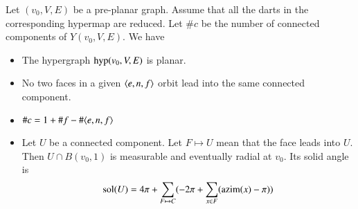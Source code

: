 \begin{lemma}  Let $(v_0,V,E)$ be a pre-planar graph.  Assume
that all the darts in the corresponding hypermap are reduced.   
Let $\#c$ be the number
of connected components of $Y(v_0,V,E)$.  We have
    \begin{itemize}
    \item The hypergraph ${\operatorname{hyp}}(v_0,V,E)$ is planar.
    \item No two faces in a given $\langle e,n,f\rangle$ orbit lead
    into the same connected component.
    \item $\#c = 1 + \#f - \#\langle e,n,f\rangle$
    \item Let $U$ be a connected component. Let $F\mapsto U$ mean
    that the face leads into $U$.  Then $U \cap B(v_0,1)$ 
       is measurable and eventually radial at $v_0$.  Its solid angle is
        $${\operatorname{sol}}(U) = 4\pi + \sum_{F\mapsto C}(-2\pi + \sum_{x\in F}
        ({\operatorname{azim}}(x)-\pi))$$
    \end{itemize}
\end{lemma}

